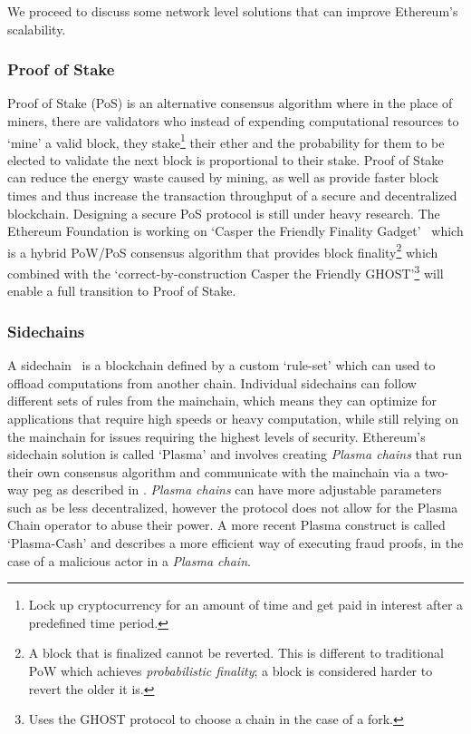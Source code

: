 

We proceed to discuss some network level solutions that can improve Ethereum's scalability.

\subsubsection*{Proof of Stake}
Proof of Stake (PoS) is an alternative consensus algorithm where in the place of miners, there are validators who instead of expending computational resources to `mine' a valid block, they stake\footnote{Lock up cryptocurrency for an amount of time and get paid in interest after a predefined time period.} their ether and the probability for them to be elected to validate the next block is proportional to their stake. Proof of Stake can reduce the energy waste caused by mining, as well as provide faster block times and thus increase the transaction throughput of a secure and decentralized blockchain. Designing a secure PoS protocol is still under heavy research. The Ethereum Foundation is working on `Casper the Friendly Finality Gadget'~\cite{casperffg} which is a hybrid PoW/PoS consensus algorithm that provides block finality\footnote{A block that is finalized cannot be reverted. This is different to traditional PoW which achieves \textit{probabilistic finality}; a block is considered harder to revert the older it is.} which combined with the `correct-by-construction Casper the Friendly GHOST'\footnote{Uses the GHOST protocol to choose a chain in the case of a fork.} \cite{caspertfg} will enable a full transition to Proof of Stake. 

\subsubsection*{Sidechains}
A sidechain~\cite{sidechains} is a blockchain defined by a custom `rule-set' which can used to offload computations from another chain. Individual sidechains can follow different sets of rules from the mainchain, which means they can optimize for applications that require high speeds or heavy computation, while still relying on the mainchain for issues requiring the highest levels of security. Ethereum's sidechain solution is called `Plasma' \cite{plasma} and involves creating \textit{Plasma chains} that run their own consensus algorithm and communicate with the mainchain via a two-way peg as described in \cite{sidechains}. \textit{Plasma chains} can have more adjustable parameters such as be less decentralized, however the protocol does not allow for the Plasma Chain operator to abuse their power. A more recent Plasma construct is called `Plasma-Cash' \cite{plasmacash} and describes a more efficient way of executing fraud proofs, in the case of a malicious actor in a \textit{Plasma chain}.

